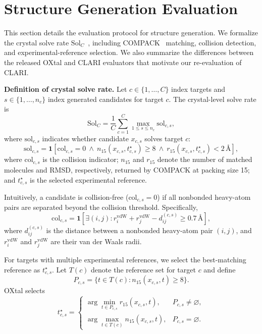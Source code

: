 \section{Structure Generation Evaluation}
\label{app:structure-generation-evaluation}

This section details the evaluation protocol for structure generation. We
formalize the crystal solve rate $\mathrm{Sol}_C$~\citep{jin2025oxtal},
including COMPACK~\citep{chisholm2005compack} matching, collision detection,
and experimental-reference selection. We also summarize the differences between
the released OXtal and CLARI evaluators that motivate our re-evaluation of CLARI.

\textbf{Definition of crystal solve rate.}
Let $c\in\{1,\ldots,C\}$ index targets and
$s\in\{1,\ldots,n_c\}$ index generated candidates for target $c$. The
crystal-level solve rate is
\begin{equation}
    \mathrm{Sol}_C
    =\frac{1}{C}\sum_{c=1}^{C}\max_{1\leq s\leq n_c}
        \mathrm{sol}_{c,s},
\end{equation}
where $\mathrm{sol}_{c,s}$ indicates whether candidate $x_{c,s}$ solves target
$c$:
\begin{equation}
    \mathrm{sol}_{c,s}
    =\mathbf{1}\!\left[
        \mathrm{col}_{c,s}=0
        \ \land\ n_{15}(x_{c,s},t^\star_{c,s})\geq 8
        \ \land\ r_{15}(x_{c,s},t^\star_{c,s})<2\,\text{\AA}
    \right],
\end{equation}
where $\mathrm{col}_{c,s}$ is the collision indicator; $n_{15}$ and $r_{15}$
denote the number of matched molecules and RMSD, respectively, returned by
COMPACK at packing size 15; and $t^\star_{c,s}$ is the selected experimental
reference.

Intuitively, a candidate is collision-free ($\mathrm{col}_{c,s}=0$) if all
nonbonded heavy-atom pairs are separated beyond the collision threshold.
Specifically,
\begin{equation}
    \mathrm{col}_{c,s}
    =\mathbf{1}\!\left[
        \exists(i,j):
        r_i^{\mathrm{vdW}}+r_j^{\mathrm{vdW}}-d_{ij}^{(c,s)}
        \geq 0.7\,\text{\AA}
    \right],
\end{equation}
where $d_{ij}^{(c,s)}$ is the distance between a nonbonded heavy-atom pair
$(i,j)$, and $r_i^{\mathrm{vdW}}$ and $r_j^{\mathrm{vdW}}$ are their van der
Waals radii.

For targets with multiple experimental references, we select the best-matching
reference as $t^\star_{c,s}$. Let $T(c)$ denote the reference set for target $c$
and define
\begin{equation}
    P_{c,s}=\{t\in T(c):n_{15}(x_{c,s},t)\geq 8\}.
\end{equation}
OXtal selects
\begin{equation}
    t^\star_{c,s}=
    \begin{cases}
        \displaystyle\arg\min_{t\in P_{c,s}} r_{15}(x_{c,s},t),
        & P_{c,s}\neq\varnothing,\\[3pt]
        \displaystyle\arg\max_{t\in T(c)} n_{15}(x_{c,s},t),
        & P_{c,s}=\varnothing.
    \end{cases}
\end{equation}

